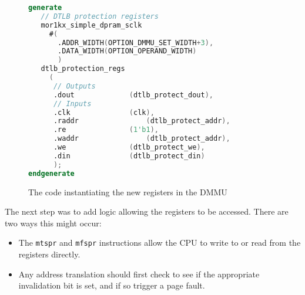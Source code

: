 \begin{figure}[t]
  \centering
  \begin{lstlisting}[language=Verilog]
generate
   // DTLB protection registers
   mor1kx_simple_dpram_sclk
     #(
       .ADDR_WIDTH(OPTION_DMMU_SET_WIDTH+3),
       .DATA_WIDTH(OPTION_OPERAND_WIDTH)
       )
   dtlb_protection_regs
     (
      // Outputs
      .dout				(dtlb_protect_dout),
      // Inputs
      .clk				(clk),
      .raddr				(dtlb_protect_addr),
      .re				(1'b1),
      .waddr				(dtlb_protect_addr),
      .we				(dtlb_protect_we),
      .din				(dtlb_protect_din)
      );
endgenerate
  \end{lstlisting}
  \caption{The code instantiating the new registers in the DMMU}
  \label{fig:regs_inst}
\end{figure}

The next step was to add logic allowing the registers to be accessed. There are two ways this might occur:
\begin{itemize}
	\item The \texttt{mtspr} and \texttt{mfspr} instructions allow the CPU to write to or read from the registers directly.
	\item Any address translation should first check to see if the appropriate invalidation bit is set, and if so trigger a page fault.
\end{itemize}

